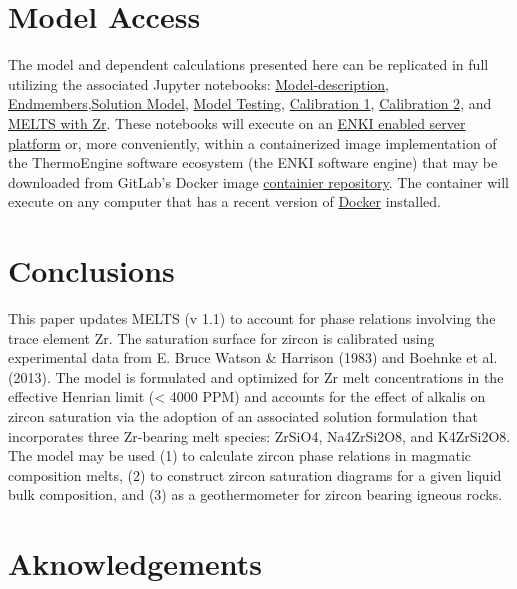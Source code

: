 \documentclass[
]{agujournal2019}
\begin{document}
\section{Model Access}\label{model-access}

The model and dependent calculations presented here can be replicated in
full utilizing the associated Jupyter notebooks:
\href{notebooks/1-Model-description.ipynb}{Model-description},
\href{notebooks/2-Endmembers-MELTS.ipynb}{Endmembers},\href{notebooks/3-Liquid-MELTS-codegen.ipynb}{Solution
Model}, \href{notebooks/4-Liquid-MELTS-API-tests.ipynb}{Model Testing},
\href{notebooks/5-Liquid-MELTS-calib-1.ipynb}{Calibration 1},
\href{notebooks/6-Liquid-MELTS-calib-2.ipynb}{Calibration 2}, and
\href{notebooks/7-MELTS-with-Zr.ipynb}{MELTS with Zr}. These notebooks
will execute on an \href{http://enki-portal.org/index.html}{ENKI enabled
server platform} or, more conveniently, within a containerized image
implementation of the ThermoEngine software ecosystem (the ENKI software
engine) that may be downloaded from GitLab's Docker image
\href{https://gitlab.com/ENKI-portal/ThermoEngine}{containier
repository}. The container will execute on any computer that has a
recent version of \href{https://www.docker.com}{Docker} installed.

\section{Conclusions}\label{conclusions}

This paper updates MELTS (v 1.1) to account for phase relations
involving the trace element Zr. The saturation surface for zircon is
calibrated using experimental data from E. Bruce Watson \& Harrison
(1983) and Boehnke et al. (2013). The model is formulated and optimized
for Zr melt concentrations in the effective Henrian limit (\textless{}
4000 PPM) and accounts for the effect of alkalis on zircon saturation
via the adoption of an associated solution formulation that incorporates
three Zr-bearing melt species: ZrSiO4, Na4ZrSi2O8, and K4ZrSi2O8. The
model may be used (1) to calculate zircon phase relations in magmatic
composition melts, (2) to construct zircon saturation diagrams for a
given liquid bulk composition, and (3) as a geothermometer for zircon
bearing igneous rocks.

\section{Aknowledgements}\label{aknowledgements}
\end{document}
